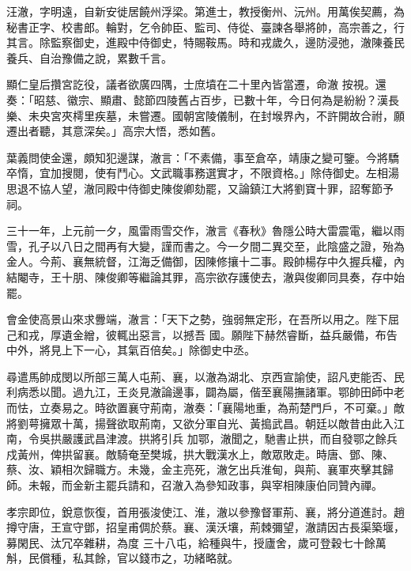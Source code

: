\begin{pinyinscope}
 汪澈，字明遠，自新安徙居饒州浮梁。第進士，教授衡州、沅州。用萬俟契薦，為秘書正字、校書郎。輪對，乞令帥臣、監司、侍從、臺諫各舉將帥，高宗善之，行其言。除監察御史，進殿中侍御史，特賜鞍馬。時和戎歲久，邊防浸弛，澈陳養民養兵、自治豫備之說，累數千言。



 顯仁皇后攢宮訖役，議者欲廣四隅，士庶墳在二十里內皆當遷，命澈
 按視。還奏：「昭慈、徽宗、顯肅、懿節四陵舊占百步，已數十年，今日何為是紛紛？漢長樂、未央宮夾樗里疾墓，未嘗遷。國朝宮陵儀制，在封堠界內，不許開故合祔，願遷出者聽，其意深矣。」高宗大悟，悉如舊。



 葉義問使金還，頗知犯邊謀，澈言：「不素備，事至倉卒，靖康之變可鑒。今將驕卒惰，宜加搜閱，使有鬥心。文武職事務選實才，不限資格。」除侍御史。左相湯思退不協人望，澈同殿中侍御史陳俊卿劾罷，又論鎮江大將劉寶十罪，詔奪節予祠。



 三十一年，上元前一夕，風雷雨雪交作，澈言《春秋》魯隱公時大雷震電，繼以雨雪，孔子以八日之間再有大變，謹而書之。今一夕間二異交至，此陰盛之證，殆為金人。今荊、襄無統督，江海乏備御，因陳修攘十二事。殿帥楊存中久握兵權，內結閹寺，王十朋、陳俊卿等繼論其罪，高宗欲存護使去，澈與俊卿同具奏，存中始罷。



 會金使高景山來求釁端，澈言：「天下之勢，強弱無定形，在吾所以用之。陛下屈己和戎，厚遺金繒，彼輒出惡言，以撼吾
 國。願陛下赫然睿斷，益兵嚴備，布告中外，將見上下一心，其氣百倍矣。」除御史中丞。



 尋遣馬帥成閔以所部三萬人屯荊、襄，以澈為湖北、京西宣諭使，詔凡吏能否、民利病悉以聞。過九江，王炎見澈論邊事，闢為屬，偕至襄陽撫諸軍。鄂帥田師中老而怯，立奏易之。時欲置襄守荊南，澈奏：「襄陽地重，為荊楚門戶，不可棄。」敵將劉萼擁眾十萬，揚聲欲取荊南，又欲分軍自光、黃搗武昌。朝廷以敵昔由此入江南，令吳拱嚴護武昌津渡。拱將引兵
 加鄂，澈聞之，馳書止拱，而自發鄂之餘兵戍黃州，俾拱留襄。敵騎奄至樊城，拱大戰漢水上，敵眾敗走。時唐、鄧、陳、蔡、汝、穎相次歸職方。未幾，金主亮死，澈乞出兵淮甸，與荊、襄軍夾擊其歸師。未報，而金新主罷兵請和，召澈入為參知政事，與宰相陳康伯同贊內禪。



 孝宗即位，銳意恢復，首用張浚使江、淮，澈以參豫督軍荊、襄，將分道進討。趙撙守唐，王宣守鄧，招皇甫倜於蔡。襄、漢沃壤，荊棘彌望，澈請因古長渠築堰，募閑民、汰冗卒雜耕，為度
 三十八屯，給種與牛，授廬舍，歲可登穀七十餘萬斛，民償種，私其餘，官以錢市之，功緒略就。




\end{pinyinscope}
